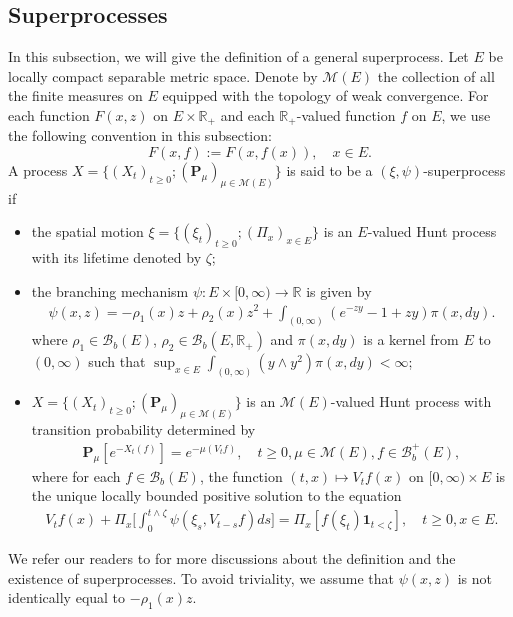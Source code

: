 \documentclass[12pt,a4paper]{amsart}
\theoremstyle{plain}
\theoremstyle{definition}
\numberwithin{equation}{section}
\begin{document}
\subsection{Superprocesses}
\label{sec: definition of superprocess}
In this subsection, we will give the definition of a general superprocess.
Let $E$ be locally compact separable metric space. Denote by $\mathcal M(E)$ the collection of all the finite measures on $E$ equipped with the topology of weak convergence.
For each function $F(x,z)$ on $E\times \mathbb R_+$ and each $\mathbb R_+$-valued function $f$ on $E$, we use the following convention in this subsection:
\[
  F(x,f)
  := F(x,f(x)),\quad x\in E.
\]
A process $X=\{(X_t)_{t\geq 0}; (\mathbf P_\mu)_{\mu \in \mathcal M(E)}\}$ is said to be a $(\xi,\psi)$-superprocess if
\begin{itemize}
\item
  the spatial motion $\xi=\{(\xi_t)_{t\geq 0};(\Pi_x)_{x\in E}\}$ is an $E$-valued Hunt process with its lifetime denoted by $\zeta$;
\item
  the branching mechanism $\psi: E\times[0,\infty) \to \mathbb R$ is given by
\begin{align}
  \label{eq: branching mechanism}
  \psi(x,z)=
  -\rho_1(x) z + \rho_2 (x) z^2 + \int_{(0,\infty)} (e^{-zy} - 1 + zy) \pi(x,dy).
\end{align}
where $\rho_1 \in \mathcal B_b(E)$, $\rho_2 \in \mathcal B_b(E, \mathbb R_+)$ and $\pi(x,dy)$ is a kernel from $E$ to $(0,\infty)$ such that $\sup_{x\in E} \int_{(0,\infty)} (y\wedge y^2) \pi(x,dy) < \infty$;
\item
  $X=\{(X_t)_{t\geq 0}; (\mathbf P_\mu)_{\mu \in \mathcal M(E)}\}$ is an $\mathcal M(E)$-valued Hunt process with transition probability determined by
  \begin{align}
    \mathbf P_\mu [e^{-X_t(f)}] = e^{-\mu(V_tf)},
    \quad t\geq 0, \mu \in \mathcal M(E), f\in \mathcal B^+_b(E),
  \end{align}
  where for each $f\in \mathcal B_b(E)$, the function $(t,x)\mapsto V_tf(x)$ on $[0,\infty) \times E$ is the unique locally bounded positive solution to the equation
  \begin{align}
    \label{eq:FKPP_in_definition}
    V_tf(x) + \Pi_x \Big[  \int_0^{t\wedge \zeta} \psi(\xi_s,V_{t-s}f)ds \Big]
    = \Pi_x [ f(\xi_t)\mathbf 1_{t<\zeta} ],
    \quad t \geq 0, x \in E.
  \end{align}
\end{itemize}
We refer our readers to \cite{Li2011Measure-valued} for more discussions about the definition and the existence of superprocesses.
To avoid triviality, we assume that $\psi(x,z)$ is not identically equal to $-\rho_1(x)z$.
\end{document}
